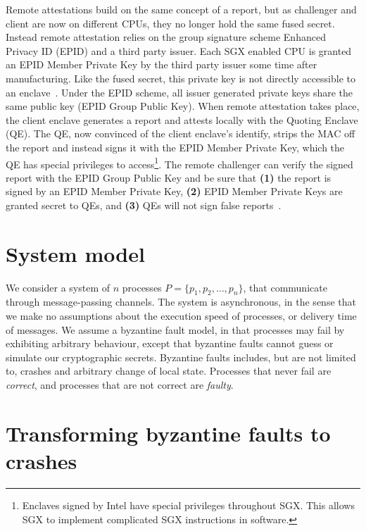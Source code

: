 \documentclass{article}
\begin{document}
			Remote attestations build on the same concept of a report, but as challenger and client are now on different CPUs, they no longer hold the same fused secret.
			Instead remote attestation relies on the group signature scheme Enhanced Privacy ID (EPID) and a third party issuer.
			Each SGX enabled CPU is granted an EPID Member Private Key by the third party issuer some time after manufacturing.
			Like the fused secret, this private key is not directly accessible to an enclave~\cite{costan_intel_2016}.
			Under the EPID scheme, all issuer generated private keys share the same public key (EPID Group Public Key).
			When remote attestation takes place, the client enclave generates a report and attests locally with the Quoting Enclave (QE).
			The QE, now convinced of the client enclave's identify, strips the MAC off the report and instead signs it with the EPID Member Private Key, which the QE has special privileges to access\footnote{Enclaves signed by Intel have special privileges throughout SGX. This allows SGX to implement complicated SGX instructions in software.}.
			The remote challenger can verify the signed report with the EPID Group Public Key and be sure that \textbf{(1)} the report is signed by an EPID Member Private Key, \textbf{(2)} EPID Member Private Keys are granted secret to QEs, and \textbf{(3)} QEs will not sign false reports~\cite{costan_intel_2016}.

	\section{System model}

	We consider a system of $n$ processes $P=\{p_1, p_2, \dots, p_n\}$, that communicate through message-passing channels.
	The system is asynchronous, in the sense that we make no assumptions about the execution speed of processes, or delivery time of messages.
	We assume a byzantine fault model, in that processes may fail by exhibiting arbitrary behaviour, except	that byzantine faults cannot guess or simulate our cryptographic secrets.
	Byzantine faults includes, but are not limited to, crashes and arbitrary change of local state.
	Processes that never fail are \textit{correct}, and processes that are not correct are \textit{faulty}.

	\section{Transforming byzantine faults to crashes}
	\label{sec:transforming-byzantine-faults}
\end{document}
